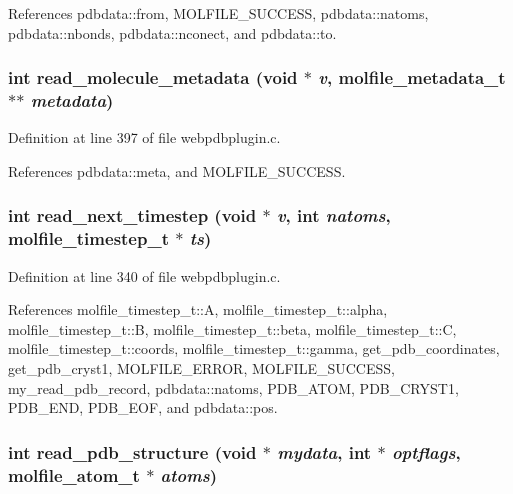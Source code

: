 References pdbdata::from, MOLFILE\_\-SUCCESS, pdbdata::natoms, pdbdata::nbonds, pdbdata::nconect, and pdbdata::to.
\subsubsection{\setlength{\rightskip}{0pt plus 5cm}int read\_\-molecule\_\-metadata (void $\ast$ {\em v}, {\bf molfile\_\-metadata\_\-t} $\ast$$\ast$ {\em metadata})\hspace{0.3cm}{\tt  [static]}}\label{webpdbplugin_8c_a10}




Definition at line 397 of file webpdbplugin.c.

References pdbdata::meta, and MOLFILE\_\-SUCCESS.
\subsubsection{\setlength{\rightskip}{0pt plus 5cm}int read\_\-next\_\-timestep (void $\ast$ {\em v}, int {\em natoms}, {\bf molfile\_\-timestep\_\-t} $\ast$ {\em ts})\hspace{0.3cm}{\tt  [static]}}\label{webpdbplugin_8c_a8}




Definition at line 340 of file webpdbplugin.c.

References molfile\_\-timestep\_\-t::A, molfile\_\-timestep\_\-t::alpha, molfile\_\-timestep\_\-t::B, molfile\_\-timestep\_\-t::beta, molfile\_\-timestep\_\-t::C, molfile\_\-timestep\_\-t::coords, molfile\_\-timestep\_\-t::gamma, get\_\-pdb\_\-coordinates, get\_\-pdb\_\-cryst1, MOLFILE\_\-ERROR, MOLFILE\_\-SUCCESS, my\_\-read\_\-pdb\_\-record, pdbdata::natoms, PDB\_\-ATOM, PDB\_\-CRYST1, PDB\_\-END, PDB\_\-EOF, and pdbdata::pos.
\subsubsection{\setlength{\rightskip}{0pt plus 5cm}int read\_\-pdb\_\-structure (void $\ast$ {\em mydata}, int $\ast$ {\em optflags}, {\bf molfile\_\-atom\_\-t} $\ast$ {\em atoms})\hspace{0.3cm}{\tt  [static]}}\label{webpdbplugin_8c_a6}




